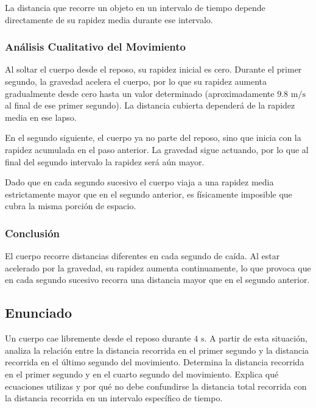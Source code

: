 \documentclass[12pt, a4paper]{article}
\begin{document}
La distancia que recorre un objeto en un intervalo de tiempo depende directamente de su rapidez media durante ese intervalo.

\subsubsection*{Análisis Cualitativo del Movimiento}

Al soltar el cuerpo desde el reposo, su rapidez inicial es cero. Durante el primer segundo, la gravedad acelera el cuerpo, por lo que su rapidez aumenta gradualmente desde cero hasta un valor determinado (aproximadamente $9.8 \text{ m/s}$ al final de ese primer segundo). La distancia cubierta dependerá de la rapidez media en ese lapso.

En el segundo siguiente, el cuerpo ya no parte del reposo, sino que inicia con la rapidez acumulada en el paso anterior. La gravedad sigue actuando, por lo que al final del segundo intervalo la rapidez será aún mayor. 

Dado que en cada segundo sucesivo el cuerpo viaja a una rapidez media estrictamente mayor que en el segundo anterior, es físicamente imposible que cubra la misma porción de espacio.

\subsubsection*{Conclusión}

El cuerpo recorre distancias diferentes en cada segundo de caída. Al estar acelerado por la gravedad, su rapidez aumenta continuamente, lo que provoca que en cada segundo sucesivo recorra una distancia mayor que en el segundo anterior.

\newpage

\subsection*{Enunciado}

Un cuerpo cae libremente desde el reposo durante $4 \text{ s}$. A partir de esta situación, analiza la relación entre la distancia recorrida en el primer segundo y la distancia recorrida en el último segundo del movimiento. Determina la distancia recorrida en el primer segundo y en el cuarto segundo del movimiento. Explica qué ecuaciones utilizas y por qué no debe confundirse la distancia total recorrida con la distancia recorrida en un intervalo específico de tiempo.

\vspace{0.5cm}
\end{document}
